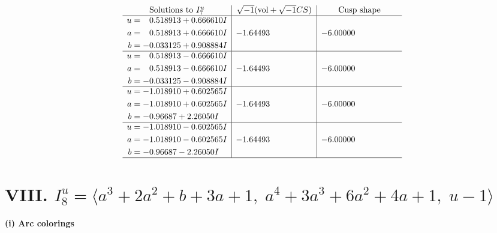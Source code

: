 \documentclass[1p]{elsarticle_modified}
\theoremstyle{definition}
\newcommand{\I}{\sqrt{-1}}
\begin{document}
$$\begin{array}{c|c|c}  
\text{Solutions to }I^u_{7}& \I (\text{vol} + \sqrt{-1}CS) & \text{Cusp shape}\\
 \hline 
\begin{aligned}
u &= \phantom{-}0.518913 + 0.666610 I \\
a &= \phantom{-}0.518913 + 0.666610 I \\
b &= -0.033125 + 0.908884 I\end{aligned}
 & -1.64493\phantom{ +0.000000I} & -6.00000\phantom{ +0.000000I} \\ \hline\begin{aligned}
u &= \phantom{-}0.518913 - 0.666610 I \\
a &= \phantom{-}0.518913 - 0.666610 I \\
b &= -0.033125 - 0.908884 I\end{aligned}
 & -1.64493\phantom{ +0.000000I} & -6.00000\phantom{ +0.000000I} \\ \hline\begin{aligned}
u &= -1.018910 + 0.602565 I \\
a &= -1.018910 + 0.602565 I \\
b &= -0.96687 + 2.26050 I\end{aligned}
 & -1.64493\phantom{ +0.000000I} & -6.00000\phantom{ +0.000000I} \\ \hline\begin{aligned}
u &= -1.018910 - 0.602565 I \\
a &= -1.018910 - 0.602565 I \\
b &= -0.96687 - 2.26050 I\end{aligned}
 & -1.64493\phantom{ +0.000000I} & -6.00000\phantom{ +0.000000I}\\
 \hline 
 \end{array}$$\newpage\newpage\renewcommand{\arraystretch}{1}
\centering \section*{VIII. $I^u_{8}= \langle a^3+2 a^2+b+3 a+1,\;a^4+3 a^3+6 a^2+4 a+1,\;u-1 \rangle$}
\flushleft \textbf{(i) Arc colorings}\\
\end{document}
